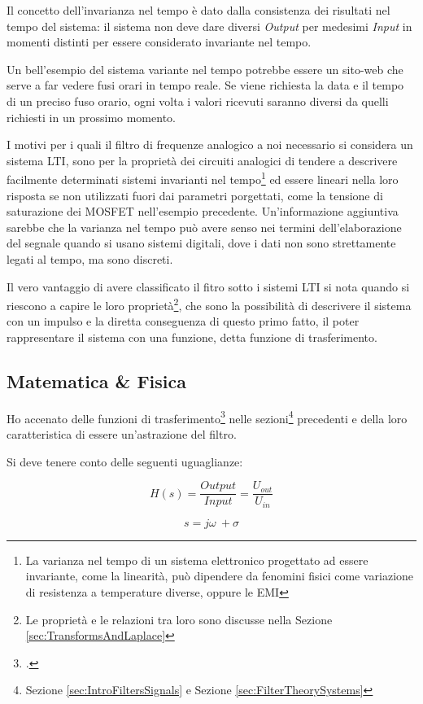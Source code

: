 \documentclass[a4paper, 10pt, final]{article} %
\begin{document}
    Il concetto dell'invarianza nel tempo \`{e} dato dalla consistenza dei risultati nel tempo del sistema: il sistema non deve dare diversi \emph{Output} per medesimi \emph{Input} in momenti distinti per essere considerato invariante nel tempo.

    Un bell'esempio del sistema variante nel tempo potrebbe essere un sito-web che serve a far vedere fusi orari in tempo reale.
    Se viene richiesta la data e il tempo di un preciso fuso orario, ogni volta i valori ricevuti saranno diversi da quelli richiesti in un prossimo momento.


    I motivi per i quali il filtro di frequenze analogico a noi necessario si considera un sistema LTI, sono per la propriet\`{a} dei circuiti analogici di tendere a descrivere facilmente determinati sistemi invarianti nel tempo\footnote{La varianza nel tempo di un sistema elettronico progettato ad essere invariante, come la linearit\`{a}, pu\`{o} dipendere da fenomini fisici come variazione di resistenza a temperature diverse, oppure le EMI} ed essere lineari nella loro risposta se non utilizzati fuori dai parametri porgettati, come la tensione di saturazione dei MOSFET nell'esempio precedente.
    Un'informazione aggiuntiva sarebbe che la varianza nel tempo pu\`{o} avere senso nei termini dell'elaborazione del segnale quando si usano sistemi digitali, dove i dati non sono strettamente legati al tempo, ma sono discreti.

    Il vero vantaggio di avere classificato il fitro sotto i sistemi LTI si nota quando si riescono a capire le loro propriet\`{a}\footnote{Le propriet\`{a} e le relazioni tra loro sono discusse nella Sezione \ref{sec:TransformsAndLaplace}}, che sono la possibilit\`{a} di descrivere il sistema con un impulso e la diretta conseguenza di questo primo fatto, il poter rappresentare il sistema con una funzione, detta funzione di trasferimento.
    \clearpage

    \subsection{Matematica \& Fisica} \label{sec:MathAndPhysics}
    Ho accenato delle funzioni di trasferimento\footcite[]{TransferFunction:Wiki} nelle sezioni\footnote{Sezione \ref{sec:IntroFiltersSignals} e Sezione \ref{sec:FilterTheorySystems}} precedenti e della loro caratteristica di essere un'astrazione del filtro.
    \begin{samepage}
        Si deve tenere conto delle seguenti uguaglianze:
        \begin{figure}[H]
            \centering
            \begin{minipage}[b]{.35\linewidth}
                \centering
                \[
                    H(s) = \frac{Output}{Input} = \frac{U_{out}}{U_{in}}
                \]
            \end{minipage}
            \begin{minipage}[b]{.35\linewidth}
                \centering
                \[
                    s = j\omega\ + \sigma
                \]
            \end{minipage}
        \end{figure}
    \end{samepage}
\end{document}
